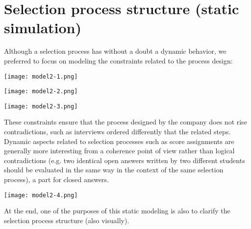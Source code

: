 	\section{Selection process structure (static simulation)}
		Although a selection process has without a doubt a dynamic behavior, we preferred to focus on modeling the constraints related to the process design:
		\begin{flushleft}
			\texttt{[image: model2-1.png]}
		\end{flushleft}
		\begin{flushleft}
			\texttt{[image: model2-2.png]}
		\end{flushleft}
		\begin{center}
			\texttt{[image: model2-3.png]}
		\end{center}
		These constraints ensure that the process designed by the company does not rise contradictions, such as interviews ordered differently that the related steps.
		Dynamic aspects related to selection processes such as score assignments are generally more interesting from a coherence point of view rather than logical contradictions (e.g. two identical open answers written by two different students should be evaluated in the same way in the context of the same selection process), a part for closed answers.
		\begin{center}
			\texttt{[image: model2-4.png]}
		\end{center}
		At the end, one of the purposes of this static modeling is also to clarify the selection process structure (also visually).